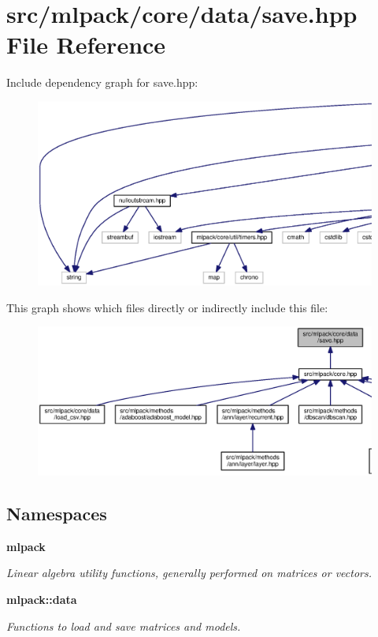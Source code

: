 \section{src/mlpack/core/data/save.hpp File Reference}
\label{save_8hpp}
Include dependency graph for save.\+hpp\+:
\nopagebreak
\begin{figure}[H]
\begin{center}
\leavevmode
\includegraphics[width=350pt]{save_8hpp__incl}
\end{center}
\end{figure}
This graph shows which files directly or indirectly include this file\+:
\nopagebreak
\begin{figure}[H]
\begin{center}
\leavevmode
\includegraphics[width=350pt]{save_8hpp__dep__incl}
\end{center}
\end{figure}
\subsection*{Namespaces}
\begin{DoxyCompactItemize}
\item 
 {\bf mlpack}
\begin{DoxyCompactList}\small\item\em Linear algebra utility functions, generally performed on matrices or vectors. \end{DoxyCompactList}\item 
 {\bf mlpack\+::data}
\begin{DoxyCompactList}\small\item\em Functions to load and save matrices and models. \end{DoxyCompactList}\end{DoxyCompactItemize}
